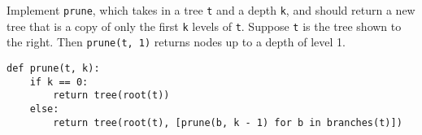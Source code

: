 \begin{blocksection}
\question Implement \lstinline$prune$, which takes in a tree \lstinline$t$ and a depth
\lstinline$k$, and should return a new tree that is a copy of only the first \lstinline$k$
levels of \lstinline$t$. Suppose \lstinline$t$ is the tree shown to the right. Then
\lstinline$prune(t, 1)$ returns nodes up to a depth of level 1.

\begin{solution}[1in]
\begin{lstlisting}
def prune(t, k):
    if k == 0:
        return tree(root(t))
    else:
        return tree(root(t), [prune(b, k - 1) for b in branches(t)])
\end{lstlisting}
\end{solution}
\end{blocksection}
